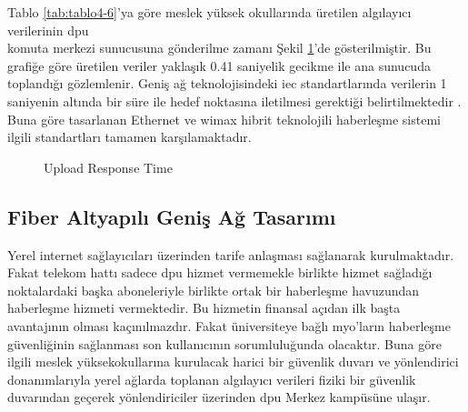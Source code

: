 Tablo \ref{tab:tablo4-6}’ya göre meslek yüksek okullarında üretilen algılayıcı verilerinin \gls{dpu} \\komuta merkezi sunucusuna gönderilme zamanı Şekil \ref{fig:4-38}’de gösterilmiştir. Bu grafiğe göre üretilen veriler yaklaşık 0.41 saniyelik gecikme ile ana sunucuda toplandığı gözlemlenir. Geniş ağ teknolojisindeki \gls{iec} standartlarında verilerin 1 saniyenin altında bir süre ile hedef noktasına iletilmesi gerektiği belirtilmektedir \cite{mackiewicz2006overview}. Buna göre tasarlanan Ethernet ve \gls{wimax} hibrit teknolojili haberleşme sistemi ilgili standartları tamamen karşılamaktadır.


\begin{figure}[htbp]
\centering



\caption{Upload Response Time}
\label{fig:4-38}
\end{figure}

\newpage
\subsection{Fiber Altyapılı Geniş Ağ Tasarımı}\label{fibeeraciklama}


Yerel internet sağlayıcıları üzerinden tarife anlaşması sağlanarak kurulmaktadır. Fakat telekom hattı sadece \gls{dpu} hizmet vermemekle birlikte hizmet sağladığı noktalardaki başka aboneleriyle birlikte ortak bir haberleşme havuzundan haberleşme hizmeti vermektedir. Bu hizmetin finansal açıdan ilk başta avantajının olması kaçınılmazdır. Fakat üniversiteye bağlı \gls{myo}'ların haberleşme güvenliğinin sağlanması son kullanıcının sorumluluğunda olacaktır. Buna göre ilgili meslek yüksekokullarına kurulacak harici bir güvenlik duvarı ve yönlendirici donanımlarıyla yerel ağlarda toplanan algılayıcı verileri fiziki bir güvenlik duvarından geçerek yönlendiriciler üzerinden \gls{dpu} Merkez kampüsüne ulaşır.


